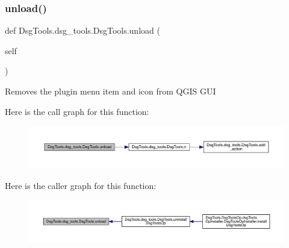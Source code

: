 \mbox{\label{class_dsg_tools_1_1dsg__tools_1_1_dsg_tools_ab52994b7701cff5d702a220e3a552f08}} 
\subsubsection{\texorpdfstring{unload()}{unload()}}
{\footnotesize\ttfamily def Dsg\+Tools.\+dsg\+\_\+tools.\+Dsg\+Tools.\+unload (\begin{DoxyParamCaption}\item[{}]{self }\end{DoxyParamCaption})}

\begin{DoxyVerb}Removes the plugin menu item and icon from QGIS GUI
\end{DoxyVerb}
 Here is the call graph for this function\+:
\nopagebreak
\begin{figure}[H]
\begin{center}
\leavevmode
\includegraphics[width=350pt]{class_dsg_tools_1_1dsg__tools_1_1_dsg_tools_ab52994b7701cff5d702a220e3a552f08_cgraph}
\end{center}
\end{figure}
Here is the caller graph for this function\+:
\nopagebreak
\begin{figure}[H]
\begin{center}
\leavevmode
\includegraphics[width=350pt]{class_dsg_tools_1_1dsg__tools_1_1_dsg_tools_ab52994b7701cff5d702a220e3a552f08_icgraph}
\end{center}
\end{figure}
\mbox{\label{class_dsg_tools_1_1dsg__tools_1_1_dsg_tools_ade2883e6962e4961c6e57893974e6cd2}} 

